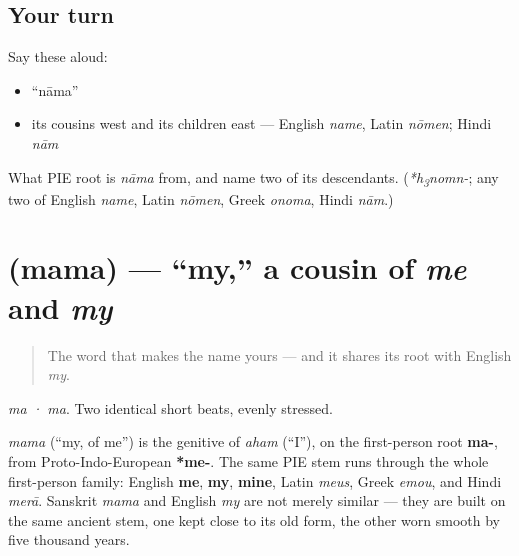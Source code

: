 \subsection*{Your turn}
Say these aloud:

\begin{itemize}
\raggedright
  \item \textquotedblleft{}nāma\textquotedblright{}
  \item its cousins west and its children east — English \emph{name}, Latin \emph{nōmen}; Hindi \emph{nām}
\end{itemize}

\begin{tcolorbox}[breakable,colback=teal!4,colframe=teal!35!black,title={Before you move on}]
What PIE root is \emph{nāma} from, and name two of its descendants. (\emph{*h\textsubscript{3}nomn-}; any two of English \emph{name}, Latin \emph{nōmen}, Greek \emph{onoma}, Hindi \emph{nām}.)
\end{tcolorbox}
\section[\texorpdfstring{\sk{मम} (mama)}{मम (mama)}]{ (mama) — \textquotedblleft{}my,\textquotedblright{} a cousin of \emph{me} and \emph{my}}

\label{lesson:SA-C02-mama}



\begin{quote}
The word that makes the name yours — and it shares its root with English \emph{my}.
\end{quote}

\begin{sounds}
\emph{ma · ma}. Two identical short beats, evenly stressed.
\end{sounds}

\begin{cousinweb}
\emph{mama} (\textquotedblleft{}my, of me\textquotedblright{}) is the genitive of \emph{aham} (\textquotedblleft{}I\textquotedblright{}), on the first-person root \textbf{ma-}, from Proto-Indo-European \textbf{*me-}. The same PIE stem runs through the whole first-person family: English \textbf{me}, \textbf{my}, \textbf{mine}, Latin \emph{meus}, Greek \emph{emou}, and Hindi \emph{merā}. Sanskrit \emph{mama} and English \emph{my} are not merely similar — they are built on the same ancient stem, one kept close to its old form, the other worn smooth by five thousand years.
\end{cousinweb}


